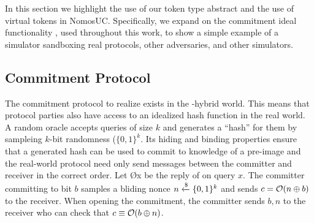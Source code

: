 In this section we highlight the use of our token type abstract and the use of virtual tokens in NomosUC.
Specifically, we expand on the commitment ideal functionality \Fcom, used throughout this work, to show a simple example of a simulator sandboxing real protocols, other adversaries, and other simulators. 

\subsection{Commitment Protocol}
The commitment protocol to realize \Fcom exists in the \Fro-hybrid world. This means that protocol parties also have access to an idealized hash function \Fro in the real world. 
A random oracle accepts queries of size $k$ and generates a ``hash'' for them by sampleing $k$-bit randomness ($\{0,1\}^k$. 
Its hiding and binding properties ensure that a generated hash can be used to commit to knowledge of a pre-image and the real-world protocol need only send messages between the committer and receiver in the correct order. 
Let \O{x} be the reply of \Fro on query $x$. 
The committer committing to bit $b$ samples a bliding nonce $n \xleftarrow{\$} \{0,1\}^k$ and sends $c = \mathcal{O}(n \oplus b)$ to the receiver. When opening the commitment, the committer sends $b, n$ to the receiver who can check that $c \equiv \mathcal{O}(b \oplus n)$.
